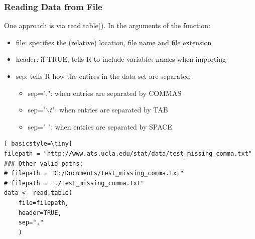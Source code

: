\begin{frame}
 \frametitle{Reading Data from File}

One approach is via \ttfamily read.table(). \normalfont  In the arguments of the function:
  \begin{itemize}
  \item \ttfamily file: \normalfont specifies the (relative) location, file name and file extension
  \item \ttfamily header: \normalfont if TRUE, tells R to include variables names when importing
  \item \ttfamily sep: \normalfont tells R how the entires in the data set are separated
    \begin{itemize}
      \item \ttfamily sep=",": \normalfont when entries are separated by COMMAS
      \item \ttfamily sep="$\backslash t$": \normalfont when entries are separated by TAB
      \item \ttfamily sep=" ": \normalfont when entries are separated by SPACE
    \end{itemize}
   \end{itemize}

\newpage   
   	\begin{lstlisting}[ basicstyle=\tiny]
filepath = "http://www.ats.ucla.edu/stat/data/test_missing_comma.txt"
### Other valid paths:
# filepath = "C:/Documents/test_missing_comma.txt"
# filepath = "./test_missing_comma.txt"
data <- read.table(
	file=filepath, 
	header=TRUE, 
	sep=","
	)
	\end{lstlisting}
\normalfont
\normalsize
\end{frame}

